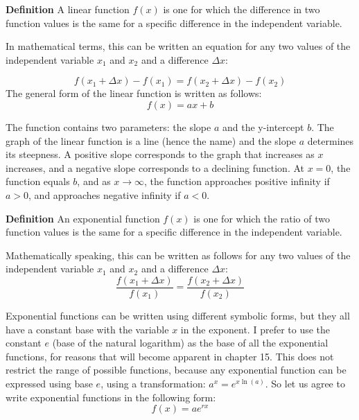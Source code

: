 \documentclass[
]{book}
\begin{document}
\label{def:ch2_linfunk}
\textbf{Definition} A  linear function \(f(x)\) is one for which the difference in two function values is the same for a specific difference in the independent variable.

In mathematical terms, this can be written an equation for any two values of the independent variable \(x_1\) and \(x_2\) and a difference \(\Delta x\):

\[ f(x_1 + \Delta x) - f(x_1) = f(x_2 + \Delta x) - f(x_2) \]
The general form of the linear function is written as follows:
\begin{equation}
f(x) = ax + b
\label{eq:linear_funk}
\end{equation}

The function contains two parameters: the  slope \(a\) and the  y-intercept \(b\). The graph of the linear function is a line (hence the name) and the slope \(a\) determines its steepness. A positive slope corresponds to the graph that increases as \(x\) increases, and a negative slope corresponds to a declining function. At \(x=0\), the function equals \(b\), and as \(x \to \infty\), the function approaches positive infinity if \(a>0\), and approaches negative infinity if \(a<0\).

\label{def:ch2_expfunk}
\textbf{Definition} An exponential function \(f(x)\) is one for which the ratio of two function values is the same for a specific difference in the independent variable.

Mathematically speaking, this can be written as follows for any two values of the independent variable \(x_1\) and \(x_2\) and a difference \(\Delta x\):
\[ \frac{f(x_1 + \Delta x)}{f(x_1)} = \frac{f(x_2 + \Delta x)}{f(x_2)}\]

Exponential functions can be written using different symbolic forms, but they all have a constant base with the variable \(x\) in the exponent. I prefer to use the constant \(e\) (base of the natural logarithm) as the base of all the exponential functions, for reasons that will become apparent in chapter 15. This does not restrict the range of possible functions, because any exponential function can be expressed using base \(e\), using a transformation: \(a^x = e^{x \ln(a)}\). So let us agree to write exponential functions in the following form:
\begin{equation}
 f(x) = a e^{rx}
\label{eq:exp_funk}
\end{equation}
\end{document}

